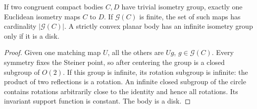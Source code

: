 \begin{lemma}\label{lem:match}
If two congruent compact bodies $C,D$ have trivial isometry group, exactly
one Euclidean isometry maps $C$ to $D$. If $\mathcal G(C)$ is finite,
the set of such maps has cardinality $|\mathcal G(C)|$. A strictly convex
planar body has an infinite isometry group only if it is a disk.
\end{lemma}
\begin{proof}
Given one matching map $U$, all the others are $Ug$, $g\in\mathcal G(C)$.
Every symmetry fixes the Steiner point, so after centering the group is
a closed subgroup of $O(2)$. If this group is infinite, its rotation
subgroup is infinite: the product of two reflections is a rotation.
An infinite closed subgroup of the circle contains rotations arbitrarily
close to the identity and hence all rotations. Its invariant support
function is constant. The body is a disk.
\end{proof}

